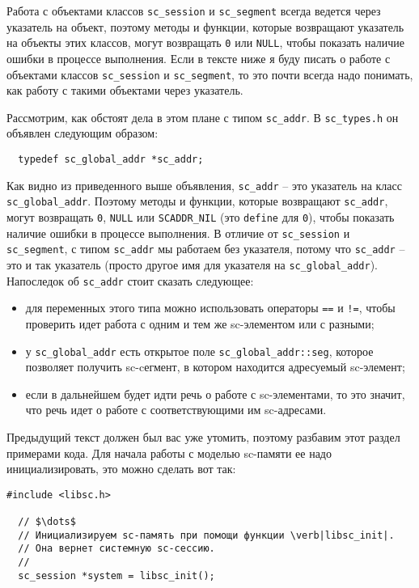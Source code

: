 Работа с объектами классов \lstinline{sc_session} и
\lstinline{sc_segment} всегда ведется через указатель на объект,
поэтому методы и функции, которые возвращают указатель на объекты этих
классов, могут возвращать \lstinline{0} или \lstinline{NULL}, чтобы
показать наличие ошибки в процессе выполнения. Если в тексте ниже я
буду писать о работе с объектами классов \lstinline{sc_session} и
\lstinline{sc_segment}, то это почти всегда надо понимать, как работу
с такими объектами через указатель.

Рассмотрим, как обстоят дела в этом плане с типом
\lstinline{sc_addr}. В \verb|sc_types.h| он объявлен следующим образом:
\begin{lstlisting}
  typedef sc_global_addr *sc_addr;
\end{lstlisting}

Как видно из приведенного выше объявления, \lstinline{sc_addr} – это
указатель на класс \lstinline{sc_global_addr}. Поэтому методы и
функции, которые возвращают \lstinline{sc_addr}, могут возвращать
\lstinline{0}, \lstinline{NULL} или \lstinline{SCADDR_NIL} (это
\lstinline{define} для \lstinline{0}), чтобы показать наличие ошибки в
процессе выполнения. В отличие от \lstinline{sc_session} и
\lstinline{sc_segment}, с типом \lstinline{sc_addr} мы работаем без
указателя, потому что \lstinline{sc_addr} – это и так указатель
(просто другое имя для указателя на
\lstinline{sc_global_addr}). Напоследок об \lstinline{sc_addr} стоит
сказать следующее:
\begin{itemize}
\item для переменных этого типа можно использовать операторы
  \lstinline{==} и \lstinline{!=}, чтобы проверить идет работа с одним
  и тем же sc-элементом или с разными;
\item у \lstinline{sc_global_addr} есть открытое поле
  \lstinline{sc_global_addr::seg}, которое позволяет получить
  sc-cегмент, в котором находится адресуемый sc-элемент;
\item если в дальнейшем будет идти речь о работе с sc-элементами, то
  это значит, что речь идет о работе с соответствующими им
  sc-адресами.
\end{itemize}

Предыдущий текст должен был вас уже утомить, поэтому разбавим этот
раздел примерами кода. Для начала работы с моделью sc-памяти ее надо
инициализировать, это можно сделать вот так:

\begin{lstlisting}[texcl]
  #include <libsc.h>

  // $\dots$
  // Инициализируем sc-память при помощи функции \verb|libsc_init|.
  // Она вернет системную sc-сессию.
  //
  sc_session *system = libsc_init();
\end{lstlisting}

